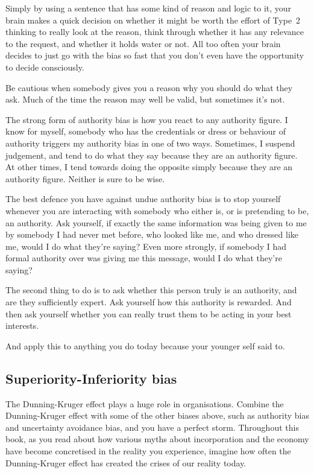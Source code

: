 Simply by using a sentence that has some kind of reason and logic to it, your brain makes a quick decision on whether it might be worth the effort of Type~2 thinking to really look at the reason, think through whether it has any relevance to the request, and whether it holds water or not. All too often your brain decides to just go with the bias so fast that you don't even have the opportunity to decide consciously.


Be cautious when somebody gives you a reason why you should do what they ask. Much of the time the reason may well be valid, but sometimes it's not. 


The strong form of authority bias is how you react to any authority figure. I know for myself, somebody who has the credentials or dress or behaviour of authority triggers my authority bias in one of two ways. Sometimes, I suspend judgement, and tend to do what they say because they are an authority figure. At other times, I tend towards doing the opposite simply because they are an authority figure. Neither is sure to be wise.


The best defence you have against undue authority bias is to stop yourself whenever you are interacting with somebody who either is, or is pretending to be, an authority. Ask yourself, if exactly the same information was being given to me by somebody I had never met before, who looked like me, and who dressed like me, would I do what they're saying? Even more strongly, if somebody I had formal authority over was giving me this message, would I do what they're saying?


The second thing to do is to ask whether this person truly is an authority, and are they sufficiently expert. Ask yourself how this authority is rewarded. And then ask yourself whether you can really trust them to be acting in your best interests. 


And apply this to anything you do today because your younger self said to.
\subsection{Superiority-Inferiority bias}
\label{section:dunning-kruger}
The Dunning-Kruger effect\cite{dunning-kruger-original,dunning-2,dunning-beyond,dunning-book} plays a huge role in organisations. Combine the Dunning-Kruger effect  with some of the other biases above, such as authority bias and uncertainty avoidance bias, and you have a perfect storm. Throughout this book, as you read about how various myths  about incorporation and the economy  have become concretised in the reality you experience, imagine how often the Dunning-Kruger effect  has created the crises of our reality today.



